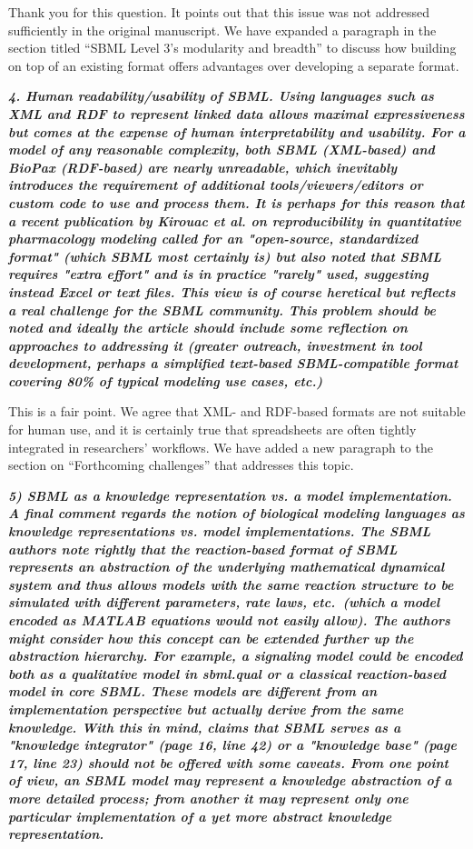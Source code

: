 \documentclass[11pt]{mhletter}
\begin{document}
Thank you for this question. It points out that this issue was not addressed sufficiently in the original manuscript.  We have expanded a paragraph in the section titled ``SBML Level 3's modularity and breadth'' to discuss how building on top of an existing format offers advantages over developing a separate format.


\textbf{\textit{4. Human readability/usability of SBML. Using languages such as XML and RDF to represent linked data allows maximal expressiveness but comes at the expense of human interpretability and usability. For a model of any reasonable complexity, both SBML (XML-based) and BioPax (RDF-based) are nearly unreadable, which inevitably introduces the requirement of additional tools/viewers/editors or custom code to use and process them. It is perhaps for this reason that a recent publication by Kirouac et al. on reproducibility in quantitative pharmacology modeling  called for an "open-source, standardized format" (which SBML most certainly is) but also noted that SBML requires "extra effort" and is in practice "rarely" used, suggesting instead Excel or text files. This view is of course heretical but reflects a real challenge for the SBML community. This problem should be noted and ideally the article should include some reflection on approaches to addressing it (greater outreach, investment in tool development, perhaps a simplified text-based SBML-compatible format covering 80\% of typical modeling use cases, etc.)}}

This is a fair point.  We agree that XML- and RDF-based formats are not suitable for human use, and it is certainly true that spreadsheets are often tightly integrated in researchers' workflows.  We have added a new paragraph to the section on ``Forthcoming challenges'' that addresses this topic.


\textbf{\textit{5) SBML as a knowledge representation vs. a model implementation.  A final comment regards the notion of biological modeling languages as knowledge representations vs. model implementations. The SBML authors note rightly that the reaction-based format of SBML represents an abstraction of the underlying mathematical dynamical system and thus allows models with the same reaction structure to be simulated with different parameters, rate laws, etc.\ (which a model encoded as MATLAB equations would not easily allow). The authors might consider how this concept can be extended further up the abstraction hierarchy. For example, a signaling model could be encoded both as a qualitative model in sbml.qual or a classical reaction-based model in core SBML. These models are different from an implementation perspective but actually derive from the same knowledge. With this in mind, claims that SBML serves as a "knowledge integrator" (page 16, line 42) or a "knowledge base" (page 17, line 23) should not be offered with some caveats. From one point of view, an SBML model may represent a knowledge abstraction of a more detailed process; from another it may represent only one particular implementation of a yet more abstract knowledge representation.}}
\end{document}
